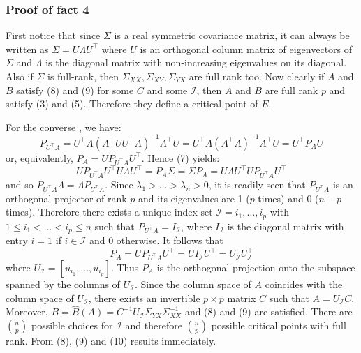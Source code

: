 \subsubsection{Proof of fact 4}
First notice that since $\Sigma$ is a real symmetric covariance matrix, it can always be written as $\Sigma = U\Lambda U^\intercal$ where $U$ is an orthogonal column matrix of eigenvectors of $\Sigma$ and $\Lambda$ is the diagonal matrix with non-increasing eigenvalues on its diagonal. Also if $\Sigma$ is full-rank, then $\Sigma_{XX},\Sigma_{XY},\Sigma_{YX}$ are full rank too. Now clearly if $A$ and $B$ satisfy (8) and (9) for some $C$ and some $\mathcal{I}$, then $A$ and $B$ are full rank $p$ and satisfy (3) and (5). Therefore they define a critical point of $E$. 

For the converse , we have:
\[
P_{U^\intercal A} = U^\intercal A (A^\intercal UU^\intercal A)^{-1} A^\intercal U = U^\intercal A(A^\intercal A)^{-1} A^\intercal U = U^\intercal P_A U
\]
or, equivalently, $P_A = UP_{U^\intercal A} U^\intercal$. Hence (7) yields:
\[
    UP_{U^\intercal A}U^\intercal U\Lambda U^\intercal = P_A\Sigma = \Sigma P_A = U\Lambda U^\intercal U P_{U^\intercal A}U^\intercal 
\]
and so $P_{U^\intercal A}\Lambda = \Lambda P_{U^\intercal A}$. Since $\lambda_1 > \dots > \lambda_n > 0$, it is readily seen that $P_{U^\intercal A}$ is an orthogonal projector of rank $p$ and its eigenvalues are 1 ($p$ times) and 0 ($n-p$ times). Therefore there exists a unique index set $\mathcal{I} = {i_1, \dots, i_p}$ with $1 \leq i_1 < \dots < i_p \leq n$ such that $P_{U^\intercal A} = I_{\mathcal{I}}$, where $I_{\mathcal{I}}$ is the diagonal matrix with entry $i=1$ if $i \in \mathcal{I}$ and 0 otherwise. It follows that 
\[
  P_A = UP_{U^\intercal A}U^\intercal = U I_{\mathcal{I}} U^\intercal = U_{\mathcal{I}} U_{\mathcal{I}}^\intercal  
\]
where $U_{\mathcal{I}} = [u_{i_1}, \dots, u_{i_p}]$. Thus $P_A$ is the orthogonal projection onto the subspace spanned by the columns of $U_{\mathcal{I}}$. Since the column space of $A$ coincides with the column space of $U_{\mathcal{I}}$, there exists an invertible $p \times p$ matrix $C$ such that $A = U_{\mathcal{I}}C$.
Moreover, $B = \hat{B}(A) = C^{-1}U_{\mathcal{I}}\Sigma_{YX}\Sigma_{XX}^{-1}$ and (8) and (9) are satisfied. There are $\binom{n}{p}$ possible choices for $\mathcal{I}$ and therefore $\binom{n}{p}$ possible critical points with full rank. From (8), (9) and (10) results immediately. 


